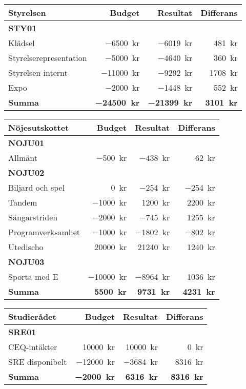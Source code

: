 \documentclass[../_main/handlingar.tex]{subfiles}
\begin{document}
\begin{tabularx}{12cm}{X r r r}
    \textbf{\large Styrelsen} & \textbf{Budget} & \textbf{Resultat} & \textbf{Differans} \\
    \hline
    \textbf{STY01} \\
    Klädsel & \SI{-6500}{kr} & \SI{-6019}{kr} & \SI{481}{kr} \\
    Styrelserepresentation & \SI{-5000}{kr} & \SI{-4640}{kr} & \SI{360}{kr} \\
    Styrelsen internt & \SI{-11000}{kr} & \SI{-9292}{kr} & \SI{1708}{kr} \\
       Expo & \SI{-2000}{kr} & \SI{-1448}{kr} & \SI{552}{kr} \\
    \hline
    \textbf{Summa} & \textbf{\SI{-24500}{kr}} & \textbf{\SI{-21399}{kr}} & \textbf{\SI{3101}{kr}}  \\
\end{tabularx}

\begin{tabularx}{12cm}{X r r r}
    \textbf{\large Nöjesutskottet} & \textbf{Budget} & \textbf{Resultat} & \textbf{Differans} \\
    \hline
    \textbf{NOJU01} \\
    Allmänt & \SI{-500}{kr} & \SI{-438}{kr} & \SI{62}{kr} \\
    \textbf{NOJU02} \\
    Biljard och spel & \SI{0}{kr} & \SI{-254}{kr} & \SI{-254}{kr} \\
    Tandem & \SI{-1000}{kr} & \SI{1200}{kr} & \SI{2200}{kr} \\
    Sångarstriden & \SI{-2000}{kr} & \SI{-745}{kr} & \SI{1255}{kr} \\
    Programverksamhet & \SI{-1000}{kr} & \SI{-1802}{kr} & \SI{-802}{kr}\\
    Utedischo & \SI{20000}{kr} & \SI{21240}{kr} & \SI{1240}{kr} \\
    \textbf{NOJU03} \\
    Sporta med E & \SI{-10000}{kr} & \SI{-8964}{kr} & \SI{1036}{kr}\\
    \hline
    \textbf{Summa} & \textbf{\SI{5500}{kr}} & \textbf{\SI{9731}{kr}} & \textbf{\SI{4231}{kr}}\\
\end{tabularx}

\begin{tabularx}{12cm}{X r r r}
    \textbf{\large Studierådet} & \textbf{Budget} & \textbf{Resultat} & \textbf{Differans}\\
    \hline
    \textbf{SRE01} \\
    CEQ-intäkter & \SI{10000}{kr} & \SI{10000}{kr} & \SI{0}{kr} \\
    SRE disponibelt & \SI{-12000}{kr} & \SI{-3684}{kr} & \SI{8316}{kr} \\
    \hline
    \textbf{Summa} & \textbf{\SI{-2000}{kr}} & \textbf{\SI{6316}{kr}} & \textbf{\SI{8316}{kr}} \\
\end{tabularx}
\end{document}
